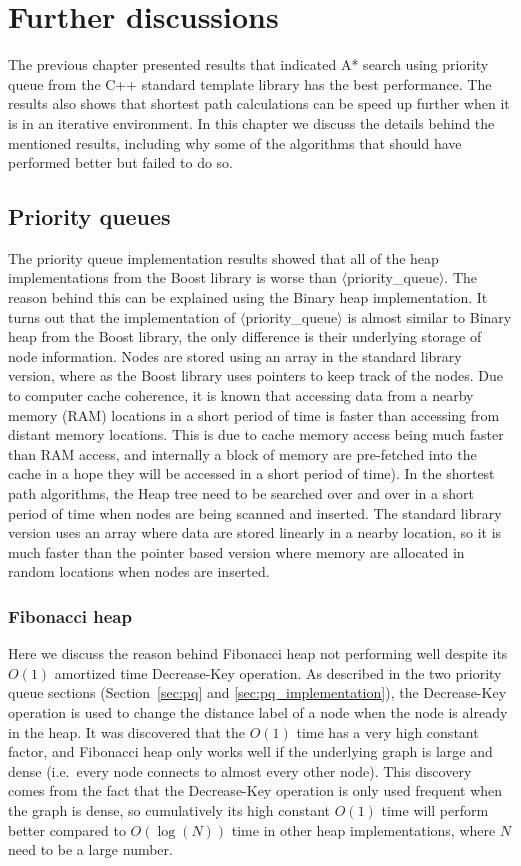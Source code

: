 \chapter{Further discussions}
The previous chapter presented results that indicated A* search using priority queue from the C++ standard template library has the best performance.
The results also shows that shortest path calculations can be speed up further when it is in an iterative environment.
In this chapter we discuss the details behind the mentioned results,
including why some of the algorithms that should have performed better but failed to do so.

\section{Priority queues}
The priority queue implementation results showed that
all of the heap implementations from the Boost library is worse than $\langle$priority\_queue$\rangle$.
The reason behind this can be explained using the Binary heap implementation.
It turns out that the implementation of $\langle$priority\_queue$\rangle$ is almost similar to Binary heap from the Boost library,
the only difference is their underlying storage of node information.
Nodes are stored using an array in the standard library version,
where as the Boost library uses pointers to keep track of 
the nodes.
Due to computer cache coherence,
it is known that accessing data from a nearby memory (RAM) locations in a short period of time is faster than accessing from distant memory locations.
This is due to cache memory access being much faster than RAM access,
and internally a block of memory are pre-fetched into the cache in a hope they will be accessed in a short period of time).
In the shortest path algorithms,
the Heap tree need to be searched over and over in a short period of time when nodes are being scanned and inserted.
The standard library version uses an array where data are stored linearly in a nearby location,
so it is much faster than the pointer based version where memory are allocated in random locations when nodes are inserted.

\subsection{Fibonacci heap}
Here we discuss the reason behind Fibonacci heap not performing well despite its $O(1)$ amortized time Decrease-Key operation.
As described in the two priority queue sections (Section~\ref{sec:pq} and \ref{sec:pq_implementation}),
the Decrease-Key operation is used to change the distance label of a node when the node is already in the heap.
It was discovered that the $O(1)$ time has a very high constant factor,
and Fibonacci heap only works well if the underlying graph is large and dense (i.e.\ every node connects to almost every other node).
This discovery comes from the fact that 
the Decrease-Key operation is only used frequent when the graph is dense,
so cumulatively its high constant $O(1)$ time will perform better compared to $O(\log(N))$ time in other heap implementations, where $N$ need to be a large number.

